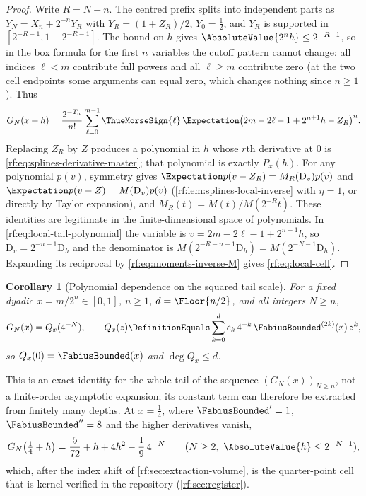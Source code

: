 \documentclass[11pt,oneside]{article}
\theoremstyle{plain}
\newtheorem{corollary}[theorem]{Corollary}
\theoremstyle{definition}
\theoremstyle{remark}
\newcommand{\Fb}{\FabiusBounded}            %
\newcommand{\tm}[1]{\ThueMorseSign{#1}}     %
\newcommand{\E}{\Expectation}
\newcommand{\Tr}[1]{T_{#1}}                 %
\newcommand{\Dop}{\mathrm{D}}               %
\begin{document}
\begin{proof}
Write $R=N-n$.  The centred prefix splits into independent parts as
$Y_{N}=X_{n}+2^{-n}Y_{R}$ with $Y_{R}=(1+Z_{R})/2$, $Y_{0}=\tfrac12$, and
$Y_{R}$ is supported in $[2^{-R-1},1-2^{-R-1}]$.  The bound on $h$ gives
$\AbsoluteValue{2^{n}h}\le2^{-R-1}$, so in the box formula for the first
$n$ variables the cutoff pattern cannot change: all indices $\ell<m$
contribute full powers and all $\ell\ge m$ contribute zero (at the two cell
endpoints some arguments can equal zero, which changes nothing since
$n\ge1$).  Thus
\begin{equation}
 G_{N}(x+h)=\frac{2^{-\Tr{n}}}{n!}\sum_{\ell=0}^{m-1}\tm{\ell}\,
 \E\bigl(2m-2\ell-1+2^{n+1}h-Z_{R}\bigr)^{n}.
 \label{rf:eq:local-tail-polynomial}
\end{equation}
Replacing $Z_{R}$ by $Z$ produces a polynomial in $h$ whose $r$th derivative
at $0$ is \cref{rf:eq:splines-derivative-master}; that polynomial is
exactly $P_{x}(h)$.  For any polynomial $p(v)$, symmetry gives
$\E p(v-Z_{R})=M_{R}(\Dop_{v})p(v)$ and $\E p(v-Z)=M(\Dop_{v})p(v)$
(\cref{rf:lem:splines-local-inverse} with $\eta=1$, or directly by Taylor
expansion), and $M_{R}(t)=M(t)/M(2^{-R}t)$.  These identities are
legitimate in the finite-dimensional space of polynomials.  In
\cref{rf:eq:local-tail-polynomial} the variable is
$v=2m-2\ell-1+2^{n+1}h$, so $\Dop_{v}=2^{-n-1}\Dop_{h}$ and the denominator
is $M(2^{-R-n-1}\Dop_{h})=M(2^{-N-1}\Dop_{h})$.  Expanding its reciprocal
by \cref{rf:eq:moments-inverse-M} gives \cref{rf:eq:local-cell}.
\end{proof}

\begin{corollary}[Polynomial dependence on the squared tail scale]
\label{rf:cor:scale-polynomial}
For a fixed dyadic $x=m/2^{n}\in[0,1]$, $n\ge1$, $d=\Floor{n/2}$, and all
integers $N\ge n$,
\begin{equation}
 G_{N}(x)=Q_{x}(4^{-N}),\qquad
 Q_{x}(z)\DefinitionEquals\sum_{k=0}^{d}e_{k}\,4^{-k}\,\Fb^{(2k)}(x)\,z^{k},
 \label{rf:eq:scale-polynomial}
\end{equation}
so $Q_{x}(0)=\Fb(x)$ and $\deg Q_{x}\le d$.
\end{corollary}

This is an exact identity for the whole tail of the sequence
$(G_{N}(x))_{N\ge n}$, not a finite-order asymptotic expansion; its constant
term can therefore be extracted from finitely many depths.  At $x=\tfrac14$,
where $\Fb'=1$, $\Fb''=8$ and the higher derivatives vanish,
\begin{equation}
 G_{N}\!\left(\tfrac14+h\right)=\frac{5}{72}+h+4h^{2}-\frac19\,4^{-N}
 \qquad(N\ge2,\ \AbsoluteValue{h}\le2^{-N-1}),
 \label{rf:eq:quarter-cell}
\end{equation}
which, after the index shift of \cref{rf:sec:extraction-volume}, is the
quarter-point cell that is kernel-verified in the repository
(\cref{rf:sec:register}).
\end{document}
